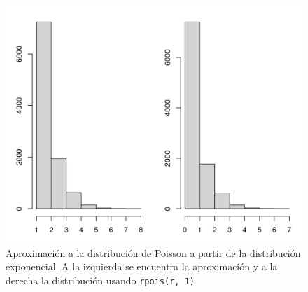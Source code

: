\documentclass[12pt]{article}
\begin{document}
	\begin{figure}
		\centering
		\includegraphics[scale=0.6]{poisson_exponencial.png}
		\caption{Aproximación a la distribución de Poisson a partir de la distribución exponencial. A la izquierda se encuentra la aproximación y a la derecha la distribución usando \texttt{rpois(r, 1)}}
		\label{poisson_exp}
	\end{figure}
	
	
	
	


\end{document}
